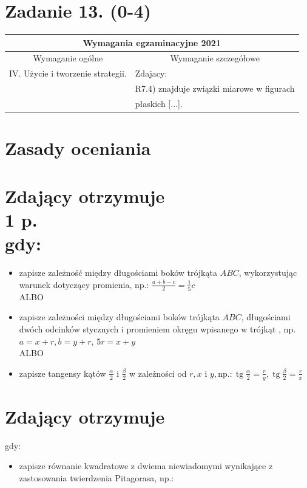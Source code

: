 \documentclass[10pt]{article}
\begin{document}
\section*{Zadanie 13. (0-4)}
\begin{center}
\begin{tabular}{|l|l|}
\hline
\multicolumn{2}{|c|}{Wymagania egzaminacyjne 2021} \\
\hline
\multicolumn{1}{|c|}{Wymaganie ogólne} & \multicolumn{1}{|c|}{Wymaganie szczegółowe} \\
\hline
IV. Użycie i tworzenie strategii. & Zdajacy: \\
 & R7.4) znajduje związki miarowe w figurach \\
 & płaskich [...]. \\
\hline
\end{tabular}
\end{center}

\section*{Zasady oceniania}
\section*{Zdający otrzymuje \\
 1 p. \\
 gdy:}
\begin{itemize}
  \item zapisze zależność między długościami boków trójkąta $A B C$, wykorzystując warunek dotyczący promienia, np.: $\frac{a+b-c}{2}=\frac{1}{5} c$\\
ALBO
  \item zapisze zależności między długościami boków trójkąta $A B C$, długościami dwóch odcinków stycznych i promieniem okręgu wpisanego w trójkąt , np. $a=x+r, b=y+r$, $5 r=x+y$\\
ALBO
  \item zapisze tangensy kątów $\frac{\alpha}{2}$ i $\frac{\beta}{2}$ w zależności od $r, x$ i $y, \mathrm{np} .: \operatorname{tg} \frac{\alpha}{2}=\frac{r}{y}, \operatorname{tg} \frac{\beta}{2}=\frac{r}{x}$
\end{itemize}

\section*{Zdający otrzymuje}
gdy:

\begin{itemize}
  \item zapisze równanie kwadratowe z dwiema niewiadomymi wynikające z zastosowania twierdzenia Pitagorasa, np.:
\end{itemize}
\end{document}
